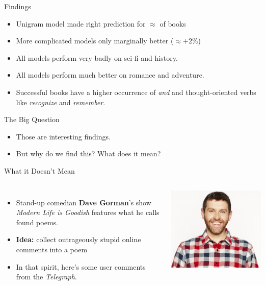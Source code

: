 \documentclass[professionalfonts, xcolor={usenames,svgnames,x11names,table}]{beamer}
\begin{document}
\begin{frame}{Findings}
    \begin{itemize}
        \item Unigram model made right prediction for
            $\approx$ of books
        \item More complicated models only marginally better ($\approx +2\%$)
        \item All models perform very badly on sci-fi and history. 
        \item All models perform much better on romance and adventure. 
        \item Successful books have a higher occurrence of \emph{and} and thought-oriented verbs like \emph{recognize} and \emph{remember}.
    \end{itemize}

    \pause
    \begin{block}{The Big Question}
        \begin{itemize}
            \item Those are interesting findings.
            \item But why do we find this? What does it mean?
        \end{itemize}
    \end{block}
\end{frame}

\begin{frame}{What it Doesn't Mean}
    \begin{columns}
            \begin{itemize}
                \item Stand-up comedian \textbf{Dave Gorman}'s show \emph{Modern Life is Goodish} features what he calls found poems.
                \item \textbf{Idea:} collect outrageously stupid online comments into a poem
                \item In that spirit, here's some user comments from the \emph{Telegraph}.
            \end{itemize}

        \includegraphics[width=.8\linewidth]{img/dave_gorman}
    \end{columns}
\end{frame}
\end{document}
